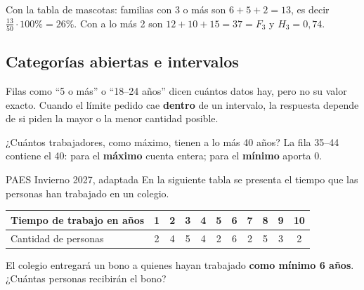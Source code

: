 \begin{ejemplo} Con la tabla de mascotas: familias con 3 o más son $6+5+2 = 13$, es decir $\frac{13}{50}\cdot 100\% = 26\%$. Con a lo más 2 son $12+10+15 = 37 = F_3$ y $H_3 = 0{,}74$.\end{ejemplo}

\subsection{Categorías abiertas e intervalos}
Filas como ``5 o más'' o ``18--24 años'' dicen cuántos datos hay, pero no su valor exacto. Cuando el límite pedido cae \textbf{dentro} de un intervalo, la respuesta depende de si piden la mayor o la menor cantidad posible.

\begin{ojo} ¿Cuántos trabajadores, como máximo, tienen a lo más 40 años? La fila 35--44 contiene el 40: para el \textbf{máximo} cuenta entera; para el \textbf{mínimo} aporta 0.\end{ojo}


\begin{elejemplo}{PAES Invierno 2027, adaptada}
En la siguiente tabla se presenta el tiempo que las personas han trabajado en un colegio.
\begin{center}\small
\begin{tabular}{@{}l*{10}{c}@{}}\toprule
Tiempo de trabajo en años & 1 & 2 & 3 & 4 & 5 & 6 & 7 & 8 & 9 & 10\\\midrule
Cantidad de personas & 2 & 4 & 5 & 4 & 2 & 6 & 2 & 5 & 3 & 2\\\bottomrule
\end{tabular}
\end{center}
El colegio entregará un bono a quienes hayan trabajado \textbf{como mínimo 6 años}. ¿Cuántas personas recibirán el bono?
\end{elejemplo}

